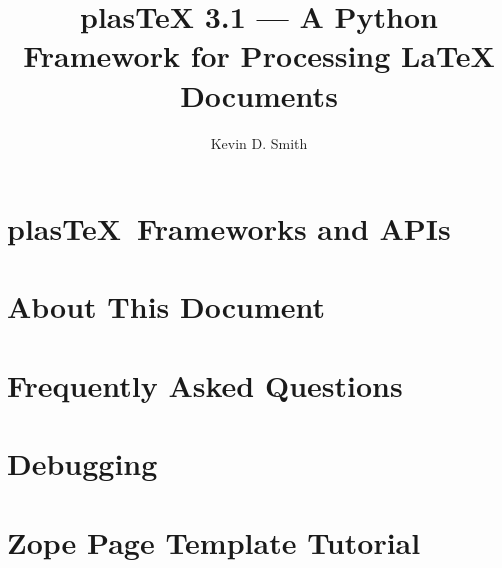 \documentclass{manual}
\title{plasTeX 3.1 --- A Python Framework for Processing LaTeX Documents}
\author{Kevin D. Smith}
\newcommand{\plasTeX}{plas\TeX}
\begin{document}
\maketitle
\cleardoublepage
\tableofcontents












\chapter{\plasTeX\ Frameworks and APIs}










\appendix

\chapter{About This Document}



\chapter{Frequently Asked Questions}



\chapter{Debugging}



\chapter{Zope Page Template Tutorial\label{sec:zpttutorial}}



\printindex
\end{document}
